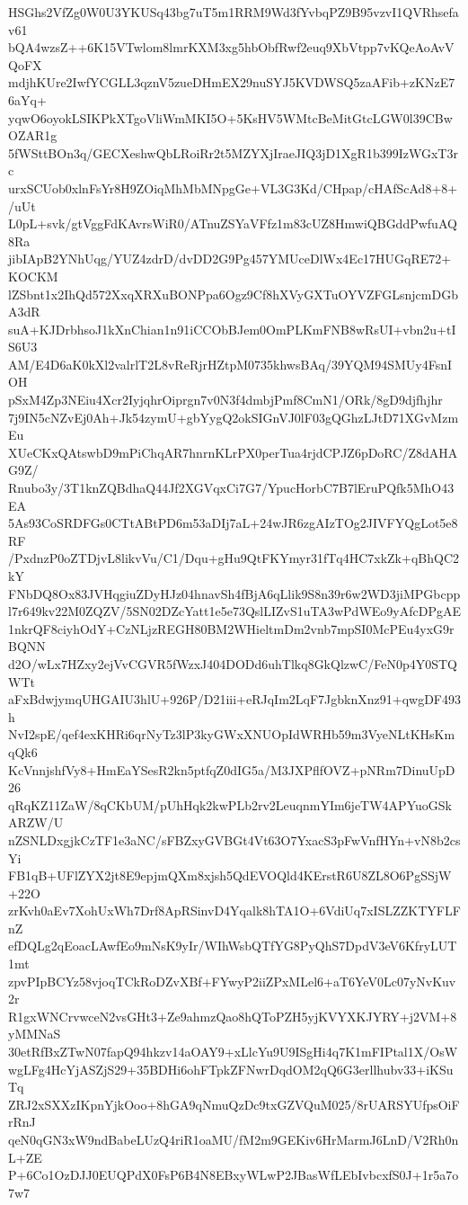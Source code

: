 HSGhs2VfZg0W0U3YKUSq43bg7uT5m1RRM9Wd3fYvbqPZ9B95vzvI1QVRhsefav61
bQA4wzsZ++6K15VTwlom8lmrKXM3xg5hbObfRwf2euq9XbVtpp7vKQeAoAvVQoFX
mdjhKUre2IwfYCGLL3qznV5zueDHmEX29nuSYJ5KVDWSQ5zaAFib+zKNzE76aYq+
yqwO6oyokLSIKPkXTgoVliWmMKI5O+5KsHV5WMtcBeMitGtcLGW0l39CBwOZAR1g
5fWSttBOn3q/GECXeshwQbLRoiRr2t5MZYXjIraeJIQ3jD1XgR1b399IzWGxT3rc
urxSCUob0xlnFsYr8H9ZOiqMhMbMNpgGe+VL3G3Kd/CHpap/cHAfScAd8+8+/uUt
L0pL+svk/gtVggFdKAvrsWiR0/ATnuZSYaVFfz1m83cUZ8HmwiQBGddPwfuAQ8Ra
jibIApB2YNhUqg/YUZ4zdrD/dvDD2G9Pg457YMUceDlWx4Ec17HUGqRE72+KOCKM
lZSbnt1x2IhQd572XxqXRXuBONPpa6Ogz9Cf8hXVyGXTuOYVZFGLsnjcmDGbA3dR
suA+KJDrbhsoJ1kXnChian1n91iCCObBJem0OmPLKmFNB8wRsUI+vbn2u+tIS6U3
AM/E4D6aK0kXl2valrlT2L8vReRjrHZtpM0735khwsBAq/39YQM94SMUy4FsnIOH
pSxM4Zp3NEiu4Xcr2IyjqhrOiprgn7v0N3f4dmbjPmf8CmN1/ORk/8gD9djfhjhr
7j9IN5cNZvEj0Ah+Jk54zymU+gbYygQ2okSIGnVJ0lF03gQGhzLJtD71XGvMzmEu
XUeCKxQAtswbD9mPiChqAR7hnrnKLrPX0perTua4rjdCPJZ6pDoRC/Z8dAHAG9Z/
Rnubo3y/3T1knZQBdhaQ44Jf2XGVqxCi7G7/YpucHorbC7B7lEruPQfk5MhO43EA
5As93CoSRDFGs0CTtABtPD6m53aDIj7aL+24wJR6zgAIzTOg2JIVFYQgLot5e8RF
/PxdnzP0oZTDjvL8likvVu/C1/Dqu+gHu9QtFKYmyr31fTq4HC7xkZk+qBhQC2kY
FNbDQ8Ox83JVHqgiuZDyHJz04hnavSh4fBjA6qLlik9S8n39r6w2WD3jiMPGbcpp
l7r649kv22M0ZQZV/5SN02DZcYatt1e5e73QslLIZvS1uTA3wPdWEo9yAfcDPgAE
1nkrQF8ciyhOdY+CzNLjzREGH80BM2WHieltmDm2vnb7mpSI0McPEu4yxG9rBQNN
d2O/wLx7HZxy2ejVvCGVR5fWzxJ404DODd6uhTlkq8GkQlzwC/FeN0p4Y0STQWTt
aFxBdwjymqUHGAIU3hlU+926P/D21iii+eRJqIm2LqF7JgbknXnz91+qwgDF493h
NvI2spE/qef4exKHRi6qrNyTz3lP3kyGWxXNUOpIdWRHb59m3VyeNLtKHsKmqQk6
KcVnnjshfVy8+HmEaYSesR2kn5ptfqZ0dIG5a/M3JXPflfOVZ+pNRm7DinuUpD26
qRqKZ11ZaW/8qCKbUM/pUhHqk2kwPLb2rv2LeuqnmYIm6jeTW4APYuoGSkARZW/U
nZSNLDxgjkCzTF1e3aNC/sFBZxyGVBGt4Vt63O7YxacS3pFwVnfHYn+vN8b2csYi
FB1qB+UFlZYX2jt8E9epjmQXm8xjsh5QdEVOQld4KErstR6U8ZL8O6PgSSjW+22O
zrKvh0aEv7XohUxWh7Drf8ApRSinvD4Yqalk8hTA1O+6VdiUq7xISLZZKTYFLFnZ
efDQLg2qEoacLAwfEo9mNsK9yIr/WIhWsbQTfYG8PyQhS7DpdV3eV6KfryLUT1mt
zpvPIpBCYz58vjoqTCkRoDZvXBf+FYwyP2iiZPxMLel6+aT6YeV0Lc07yNvKuv2r
R1gxWNCrvwceN2vsGHt3+Ze9ahmzQao8hQToPZH5yjKVYXKJYRY+j2VM+8yMMNaS
30etRfBxZTwN07fapQ94hkzv14aOAY9+xLlcYu9U9ISgHi4q7K1mFIPtal1X/OsW
wgLFg4HcYjASZjS29+35BDHi6ohFTpkZFNwrDqdOM2qQ6G3erllhubv33+iKSuTq
ZRJ2xSXXzIKpnYjkOoo+8hGA9qNmuQzDc9txGZVQuM025/8rUARSYUfpsOiFrRnJ
qeN0qGN3xW9ndBabeLUzQ4riR1oaMU/fM2m9GEKiv6HrMarmJ6LnD/V2Rh0nL+ZE
P+6Co1OzDJJ0EUQPdX0FsP6B4N8EBxyWLwP2JBasWfLEbIvbcxfS0J+1r5a7o7w7
